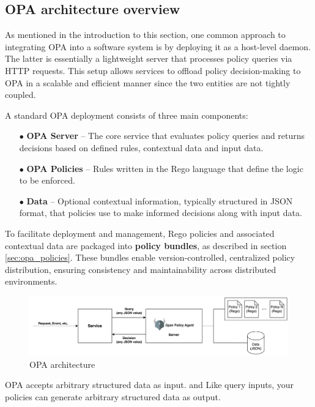 \subsection{OPA architecture overview}

As mentioned in the introduction to this section, one common approach to integrating OPA into a software system is by deploying it as a host-level daemon. The latter is essentially a lightweight server that processes policy queries via HTTP requests. This setup allows services to offload policy decision-making to OPA in a scalable and efficient manner since the two entities are not tightly coupled.

A standard OPA deployment consists of three main components:

\begin{itemize}[itemsep=0.2pt, topsep=1pt]
\item[$\bullet$] \textbf{OPA Server} – The core service that evaluates policy queries and returns decisions based on defined rules, contextual data and input data.
\item[$\bullet$] \textbf{OPA Policies} – Rules written in the Rego language that define the logic to be enforced.
\item[$\bullet$] \textbf{Data} – Optional contextual information, typically structured in JSON format, that policies use to make informed decisions along with input data.
\end{itemize}

To facilitate deployment and management, Rego policies and associated contextual data are packaged into \textbf{policy bundles}, as described in section \ref{sec:opa_policies}. These bundles enable version-controlled, centralized policy distribution, ensuring consistency and maintainability across distributed environments. \newline


\begin{figure}[htb]
\centering
\includegraphics[width=1\linewidth]{images/OPA.png}
\caption{OPA architecture}
\label{fig:opa_architecture}
\end{figure}


OPA accepts arbitrary structured data as input.
and  Like query inputs, your policies can generate arbitrary structured data as output.

